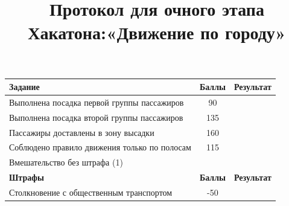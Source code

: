 \documentclass[12pt]{article}
\date{} %
\title{Протокол для очного этапа \\ Хакатона:«Движение по городу»}
\newcommand{\penaltyBusPoints}{\color{red}-50}
\newcommand{\boardingPassangersFirstZone}{90}
\newcommand{\boardingPassangersSecondZone}{135}
\newcommand{\passangersDelievery}{160}
\newcommand{\complianceTrafficRules}{115}
\begin{document}
\maketitle
\thispagestyle{empty}
\vspace*{-1.5cm}


\renewcommand{\arraystretch}{1.1}
\vspace*{0.25cm}
\begin{tabularx}{\textwidth}{|X|c|p{2cm}|}
    \hline
    \textbf{Задание} & \textbf{Баллы} & \textbf{Результат}\\
    \hline
    Выполнена посадка первой группы пассажиров & \boardingPassangersFirstZone &  \\
    \hline
    Выполнена посадка второй группы пассажиров & \boardingPassangersSecondZone & \\
    \hline
    Пассажиры доставлены в зону высадки & \passangersDelievery & \\
    \hline 
    Соблюдено правило движения только по полосам & \complianceTrafficRules & \\
    \hline
    Вмешательство без штрафа (1) &  \\
    \hline
    \textbf{Штрафы} & \textbf{Баллы} & \textbf{Результат} \\
    \hline
    Столкновение с общественным транспортом & \penaltyBusPoints &  \\
    \hline
\end{tabularx}
\vspace*{0.5cm}
\end{document}
